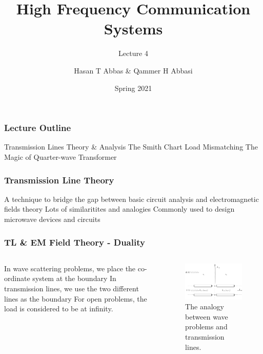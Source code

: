 \documentclass[10pt, compress]{beamer}
\title{High Frequency Communication Systems}
\subtitle{Lecture 4}
\date{Spring 2021}
\author{Hasan T Abbas \& Qammer H Abbasi}
\begin{document}
\maketitle

\begin{frame}[fragile]
  \frametitle{Lecture Outline}
\begin{outline}[itemize]
  \1 Transmission Lines Theory \& Analysis
  \1 The Smith Chart 
  \1 Load Mismatching
  \1 The Magic of Quarter-wave Transformer
\end{outline}
\end{frame}
\begin{frame}[fragile]
\frametitle{Transmission Line Theory}
\begin{outline}
  \1 A technique to bridge the gap between basic circuit analysis and electromagnetic fields theory
   \2 Lots of similaritites and analogies
    \1 Commonly used to design microwave devices and circuits
\end{outline}
\end{frame}

\begin{frame}
  \frametitle{TL \& EM Field Theory - Duality}
  \begin{columns}[T] %
  \begin{column}{.3\textwidth}
\begin{outline}
  \1 In wave scattering problems, we place the co-ordinate system at the boundary
  \1 In transmission lines, we use the two different lines as the boundary
  \1 For open problems, the load is considered to be at infinity.
  \end{outline}
   \end{column}
 \begin{column}[T]{.7\textwidth}
    \begin{figure}
      \centering
          \includegraphics[width=.9\textwidth]{circuit.pdf}
      \caption{The analogy between wave problems and transmission lines.}
    \end{figure}
      \end{column}%
\end{columns}
  \end{frame}
\end{document}
